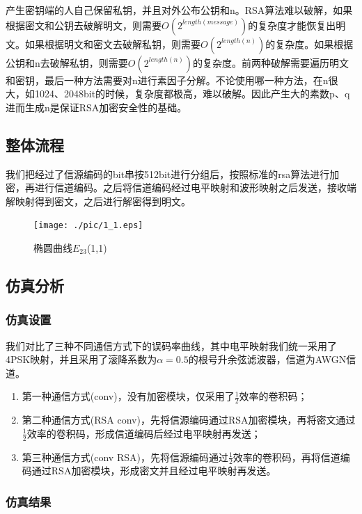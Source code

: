 产生密钥端的人自己保留私钥，并且对外公布公钥和n。RSA算法难以破解，如果根据密文和公钥去破解明文，则需要$O(2^{length(message)})$的复杂度才能恢复出明文。如果根据明文和密文去破解私钥，则需要$O(2^{length(n)})$的复杂度。如果根据公钥和n去破解私钥，则需要$O(2^{length(n)})$的复杂度。前两种破解需要遍历明文和密钥，最后一种方法需要对n进行素因子分解。不论使用哪一种方法，在n很大，如1024、2048bit的时候，复杂度都极高，难以破解。因此产生大的素数p、q进而生成n是保证RSA加密安全性的基础。

\subsection{整体流程}

我们把经过了信源编码的bit串按512bit进行分组后，按照标准的rsa算法进行加密，再进行信道编码。之后将信道编码经过电平映射和波形映射之后发送，接收端解映射得到密文，之后进行解密得到明文。

\begin{figure}[h]
	\centering
    \texttt{[image: ./pic/1\_1.eps]}
	\caption{椭圆曲线$E_{23}$(1,1)}
\end{figure}

\subsection{仿真分析}

\subsubsection{仿真设置}

我们对比了三种不同通信方式下的误码率曲线，其中电平映射我们统一采用了4PSK映射，并且采用了滚降系数为$\alpha=0.5$的根号升余弦滤波器，信道为AWGN信道。

\begin{enumerate}
    \item 第一种通信方式(conv)，没有加密模块，仅采用了$\frac{1}{2}$效率的卷积码；
    \item 第二种通信方式(RSA conv)，先将信源编码通过RSA加密模块，再将密文通过$\frac{1}{2}$效率的卷积码，形成信道编码后经过电平映射再发送；
    \item 第三种通信方式(conv RSA)，先将信源编码通过$\frac{1}{2}$效率的卷积码，再将信道编码通过RSA加密模块，形成密文并且经过电平映射再发送。
\end{enumerate}

\subsubsection{仿真结果}


